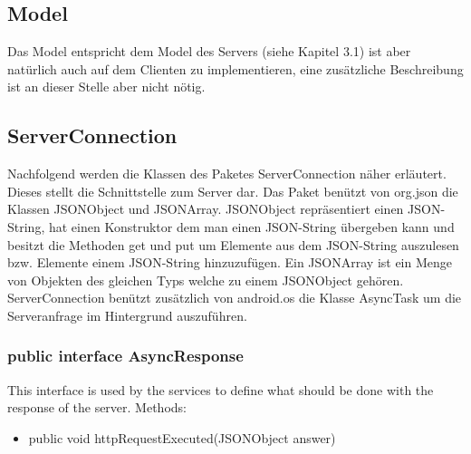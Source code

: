 	
	\subsection{Model}
	Das Model entspricht dem Model des Servers (siehe Kapitel 3.1) ist aber natürlich auch auf dem Clienten zu implementieren, eine zusätzliche Beschreibung ist an dieser Stelle aber nicht nötig.
	\newpage
	
	
	\subsection{ServerConnection}
 	Nachfolgend werden die Klassen des Paketes ServerConnection näher erläutert.
 	Dieses stellt die Schnittstelle zum Server dar. Das Paket benützt von org.json die Klassen JSONObject und JSONArray.
 	JSONObject repräsentiert einen JSON-String, hat einen Konstruktor dem man einen JSON-String übergeben kann und besitzt die Methoden get und put um Elemente aus dem JSON-String auszulesen bzw. Elemente einem JSON-String hinzuzufügen. 
 	Ein JSONArray ist ein Menge von Objekten des gleichen Typs welche zu einem JSONObject gehören.
 	ServerConnection benützt zusätzlich von android.os die Klasse AsyncTask um die Serveranfrage im Hintergrund auszuführen.
	\subsubsection{public interface AsyncResponse}
This interface is used by the services to define what should be done with the response of the server.
\newline Methods:
\begin{itemize}
	\item public void httpRequestExecuted(JSONObject answer)
	\end{itemize}
	
